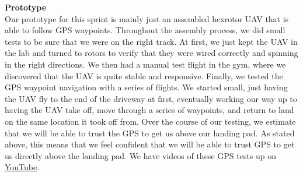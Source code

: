 \vspace{6mm}
\noindent\Large{\textbf{Prototype}}\\
\normalsize
Our prototype for this sprint is mainly just an assembled hexrotor UAV that is able to follow GPS waypoints. Throughout the assembly process, we did small tests to be sure that we were on the right track. At first, we just kept the UAV in the lab and turned to rotors to verify that they were wired correctly and spinning in the right directions. We then had a manual test flight in the gym, where we discovered that the UAV is quite stable and responsive. Finally, we tested the GPS waypoint navigation with a series of flights. We started small, just having the UAV fly to the end of the driveway at first, eventually working our way up to having the UAV take off, move through a series of waypoints, and return to land on the same location it took off from. Over the course of our testing, we estimate that we will be able to trust the GPS to get us above our landing pad. As stated above, this means that we feel confident that we will be able to trust GPS to get us directly above the landing pad. \newline\newline
We have videos of these GPS tests up on \href{https://www.youtube.com/channel/UCfcuqDXKMLgbUWu3rt9rITA}{YouTube}.

